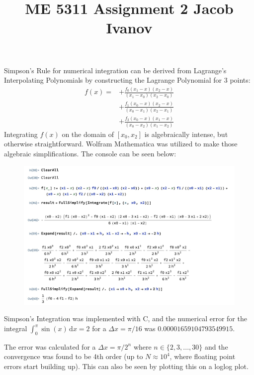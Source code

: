 \documentclass[10pt, reqno]{amsart}
\begin{document}
\title{ME 5311 \quad Assignment 2 \quad Jacob Ivanov}

\maketitle

\begin{multicols}{2}
Simpson's Rule for numerical integration can be derived from Lagrange's Interpolating Polynomials by constructing the Lagrange Polynomial for 3 points:
\begin{equation}
\begin{aligned}
    f(x) = &+\frac{f_0(x_1-x)(x_2-x)}{(x_1-x_0)(x_2-x_0)}\\
    &+\frac{f_1(x_0-x)(x_2-x)}{(x_0-x_1)(x_2-x_1)}\\
    &+\frac{f_2(x_0-x)(x_1-x)}{(x_0-x_2)(x_1-x_2)}
\end{aligned}
\end{equation}
Integrating $f(x)$ on the domain of $[x_0, x_2]$ is algebraically intense, but otherwise straightforward. Wolfram Mathematica was utilized to make those algebraic simplifications. The console can be seen below:

\begin{figure}[H]
    \centering
    \includegraphics[width=1\linewidth]{Simpson's Rule Derivation.jpg}
    \label{fig:1}
\end{figure}

Simpson's Integration was implemented with C, and the numerical error for the integral $\int_0^\pi \sin(x) \, \mathrm{d}x = 2$ for a $\Delta x = \pi/16$ was $0.00001659104793549915$.

The error was calculated for a $\Delta x = \pi/2^n$ where $n \in \{2, 3, ..., 30\}$ and the convergence was found to be 4th order (up to $N \approx 10^4$, where floating point errors start building up). This can also be seen by plotting this on a loglog plot.


\end{multicols}
\end{document}
